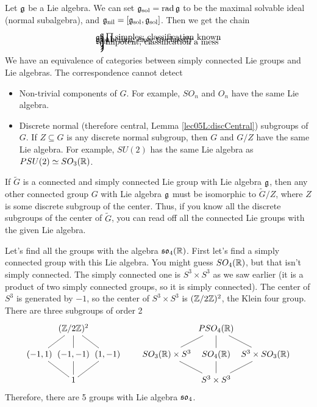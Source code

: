 
 Let $\mathfrak{g}$ be a Lie algebra. We can set $\mathfrak{g}_\text{sol} = \text{rad}\, \mathfrak{g}$ to be the
 maximal solvable ideal (normal subalgebra), and $\mathfrak{g}_\text{nil} =
 [\mathfrak{g}_\text{sol},\mathfrak{g}_\text{sol}]$. Then we get the chain
 \[\vfuzz=5pt
 \begin{xy}
   (0,3) *+{\g};
   (0,2) *+{\g_\text{sol}} **@{-};
   (0,1) *+{\g_\text{nil}} **@{-};
   (0,0) *+{0} **@{-};
   (.5,2.7);(.5,2.3) **\frm{)}; (.5,2.5) *+!L{\prod\text{simples; classification known}};
   (.5,1.7);(.5,1.3) **\frm{)}; (.5,1.5) *+!L{\text{abelian; easy to classify}};
   (.5,0.7);(.5,0.3) **\frm{)}; (.5,0.5) *+!L{\text{nilpotent; classification a mess}};
 \end{xy}
 \]
 We have an equivalence of categories between simply connected Lie groups and Lie
 algebras. The correspondence cannot detect
 \begin{itemize}
   \item Non-trivial components of $G$. For example, $SO_n$ and $O_n$ have the same
   Lie algebra.

   \item Discrete normal (therefore central, Lemma \ref{lec05L:discCentral}) subgroups
   of $G$. If $Z\subseteq G$ is any discrete normal subgroup, then $G$ and $G/Z$ have
   the same Lie algebra. For example, $SU(2)$ has the same Lie algebra as
   $PSU(2)\simeq SO_3(\mathbb{R})$.
 \end{itemize}
 If $\tilde G$ is a connected and simply connected Lie group with Lie algebra $\mathfrak{g}$,
 then any other connected group $G$ with Lie algebra $\mathfrak{g}$ must be isomorphic to
 $\tilde G/Z$, where $Z$ is some discrete subgroup of the center. Thus, if you know
 all the discrete subgroups of the center of $\tilde G$, you can read off all the
 connected Lie groups with the given Lie algebra.

 Let's find all the groups with the algebra $\mathfrak{so}_4(\mathbb{R})$. First let's find a simply
 connected group with this Lie algebra. You might guess $SO_4(\mathbb{R})$, but that isn't
 simply connected. The simply connected one is $S^3\times S^3$ as we saw earlier (it
 is a product of two simply connected groups, so it is simply connected). The center
 of $S^3$ is generated by $-1$, so the center of $S^3\times S^3$ is $(\mathbb{Z}/2\mathbb{Z})^2$,
 the Klein four group. There are three subgroups of order 2
 \[\xymatrix @!0 @R=3em @C=4em {
   & (\ZZ/2\ZZ)^2 \ar@{-}[dl] \ar@{-}[d] \ar@{-}[dr]\\
   (-1,1) \ar@{-}[dr]& (-1,-1) \ar@{-}[d]& (1,-1) \ar@{-}[dl]\\
   & 1
 }\qquad
 \xymatrix @!0 @R=3em @C=5.8em{
   & PSO_4(\RR) \ar@{-}[dl] \ar@{-}[d] \ar@{-}[dr]\\
   SO_3(\RR)\times S^3 \ar@{-}[dr]& SO_4(\RR) \ar@{-}[d]& S^3\times SO_3(\RR) \ar@{-}[dl]\\
   & S^3\times S^3
 }\]
 Therefore, there are 5 groups with Lie algebra $\mathfrak{so}_4$.

